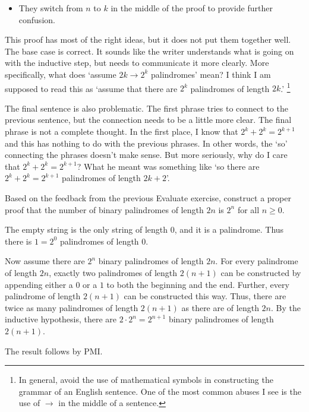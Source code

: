 \begin{eval}
\begin{answer}
\begin{pfevalenum}
\begin{itemize}
	\item 
	They switch from $n$ to $k$ in the middle of the proof to provide further confusion.
	\end{itemize}
\item
This proof has most of the right ideas, but it does not put them together well.  
The base case is correct.
It sounds like the writer understands what is going on with the inductive step, 
but needs to communicate it more clearly.
More specifically, what does `assume $2k\rightarrow 2^k$ palindromes' mean?
I think I am supposed to read this as `assume that there are $2^k$ palindromes of length $2k$.'
\footnote{In general, avoid the use of mathematical symbols in constructing the grammar of an English sentence.
One of the most common abuses I see is the use of $\rightarrow$ in the middle of a sentence.}

The final sentence is also problematic.  The first phrase tries to connect to the previous sentence,
but the connection needs to be a little more clear.  The final phrase is not a complete thought.
In the first place, I know that  $2^k+2^k=2^{k+1}$ and this has nothing to do with the previous
phrases.  In other words, the `so' connecting the phrases doesn't make sense.  But more seriously,
why do I care that $2^k+2^k=2^{k+1}$?  What he meant was something like 
`so there are $2^k+2^k=2^{k+1}$ palindromes of length $2k+2$'.
\end{pfevalenum}
\end{answer}
\end{eval}

\newpage

\begin{exer}
Based on the feedback from the previous Evaluate exercise, construct a proper proof that 
the number of binary palindromes of length $2n$ is $2^n$ for all $n\geq 0$.

\vspace*{4.75in}
\begin{answer}
The empty string is the only string of length $0$, and it is a palindrome.  
Thus there is $1=2^0$ palindromes of length $0$.

Now assume there are $2^n$ binary palindromes of length $2n$.
For every palindrome of length $2n$, exactly two palindromes of length $2(n+1)$ can be constructed
by appending either a $0$ or a $1$ to both the beginning and the end.  Further, every palindrome
of length $2(n+1)$ can be constructed this way.  Thus, there are twice as many palindromes of
length $2(n+1)$ as there are of length $2n$.  By the inductive hypothesis, there are $2\cdot 2^n=2^{n+1}$
binary palindromes of length $2(n+1)$.

The result follows by PMI.
\end{answer}
\end{exer}

